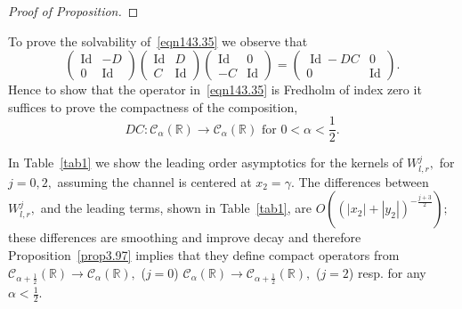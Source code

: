 \documentclass[11pt]{article}
\newcommand\cC{\mathcal{C}}
\newcommand\bbR{\mathbb R}
\newcommand\Id{\operatorname{Id}}
\theoremstyle{definition}
\theoremstyle{remark}
\begin{document}
\begin{proof}[Proof of Proposition]
 \end{proof}

 To prove the solvability of~\eqref{eqn143.35} we observe that
 \begin{equation}\label{eqn80.300}
   \left(\begin{matrix}\Id & -D\\0&\Id\end{matrix}\right) \left(\begin{matrix}\Id & D\\C&\Id\end{matrix}\right)\left(\begin{matrix}\Id & 0\\-C&\Id\end{matrix}\right)=
         \left(\begin{matrix}\Id-DC & 0\\0&\Id\end{matrix}\right).
 \end{equation}
 Hence to show that the operator in~\eqref{eqn143.35} is Fredholm of
 index zero it suffices to prove the compactness of the composition,
 \begin{equation}
   DC:\cC_{\alpha}(\bbR)\longrightarrow \cC_{\alpha}(\bbR)\text{ for }0<\alpha<\frac 12.
 \end{equation}


   In Table~\ref{tab1} we show the leading order
   asymptotics for the kernels of $W_{l,r}^j,$ for $j=0,2,$ assuming the
   channel is centered at $x_2=\gamma.$ The differences between $W_{l,r}^j,$
   and the leading terms, shown in Table~\ref{tab1}, are
   $O((|x_2|+|y_2|)^{-\frac{j+3}{2}});$ these differences are smoothing and
   improve decay and therefore Proposition~\ref{prop3.97} implies that they
   define compact operators from $\cC_{\alpha+\frac
     12}(\bbR)\to\cC_{\alpha}(\bbR),$ ($j=0$)
   $\cC_{\alpha}(\bbR)\to\cC_{\alpha+\frac 12}(\bbR),$  ($j=2$) resp. for any
   $\alpha<\frac 12.$
 
\end{document}
